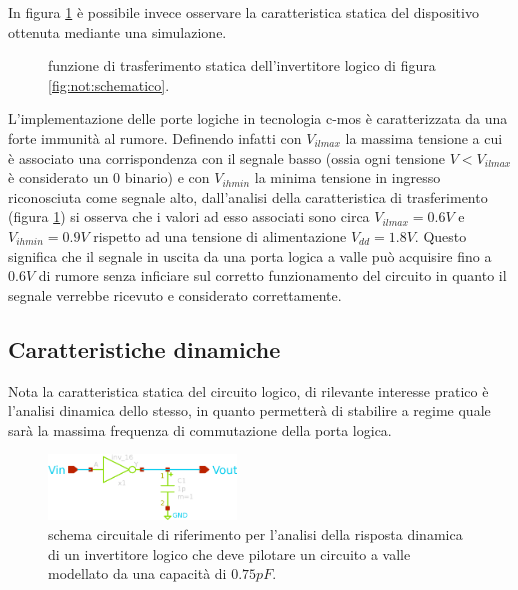 	In figura \ref{fig:not:carattstatica} è possibile invece osservare la caratteristica statica del dispositivo ottenuta mediante una simulazione.
	
	\begin{figure}[H]
		\centering
		
		\caption{funzione di trasferimento statica dell'invertitore logico di figura \ref{fig:not:schematico}.}
		\label{fig:not:carattstatica}
	\end{figure}

	L'implementazione delle porte logiche in tecnologia c-mos è caratterizzata da una forte immunità al rumore. Definendo infatti con $V_{ilmax}$ la massima tensione a cui è associato una corrispondenza con il segnale basso (ossia ogni tensione $V<V_{ilmax}$ è considerato un 0 binario) e con $V_{ihmin}$ la minima tensione in ingresso riconosciuta come segnale alto, dall'analisi della caratteristica di trasferimento (figura \ref{fig:not:carattstatica}) si osserva che i valori ad esso associati sono circa $V_{ilmax} =0.6V$ e $V_{ihmin} = 0.9V$ rispetto ad una tensione di alimentazione $V_{dd} = 1.8V$. Questo significa che il segnale in uscita da una porta logica a valle può acquisire fino a $0.6V$ di rumore senza inficiare sul corretto funzionamento del circuito in quanto il segnale verrebbe ricevuto e considerato correttamente.
	
	\subsection*{Caratteristiche dinamiche}
		
		Nota la caratteristica statica del circuito logico, di rilevante interesse pratico è l'analisi dinamica dello stesso, in quanto permetterà di stabilire a regime quale sarà la massima frequenza di commutazione della porta logica.
		
		\begin{figure}[bht]
			\centering
			\includegraphics[width=5cm]{Immagini/not-gate-carico}
			\caption{schema circuitale di riferimento per l'analisi della risposta dinamica di un invertitore logico che deve pilotare un circuito a valle modellato da una capacità di $0.75pF$.}
			\label{fig:not:dinamica-schema}
		\end{figure}
		
